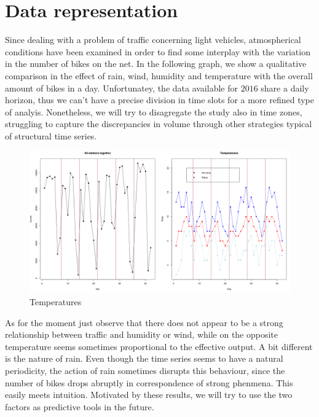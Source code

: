 \documentclass[11pt,twoside]{report}
\begin{document}
\section{Data representation}
Since dealing with a problem of traffic concerning light vehicles, atmospherical conditions have been examined in order to find some interplay with the variation in the number of bikes on the net. In the following graph, we show a qualitative comparison in the effect of rain, wind, humidity and temperature with the overall amount of bikes in a day. Unfortunatey, the data available for $ 2016 $ share a daily horizon, thus we can't have a precise division in time slots for a more refined type of analyis. Nonetheless, we will try to disagregate the study also in time zones, struggling to capture the discrepancies in volume through other strategies typical of structural time series.

\begin{figure}[H]
		\centering
		\includegraphics[width=110 mm]{pictures/temperatures.png}
		\caption{Temperatures}
		\label{fig:temperature}
\end{figure}

As for the moment just observe that there does not appear to be a strong relationship between traffic and humidity or wind, while on the opposite temperature seems sometimes proportional to the effective output. A bit different is the nature of rain. Even though the time series seems to have a natural periodicity, the action of rain sometimes disrupts this behaviour, since the number of bikes drops abruptly in correspondence of strong phenmena.  This easily meets intuition. Motivated by these results, we will try to use the two factors as predictive tools in the future.
\end{document}
